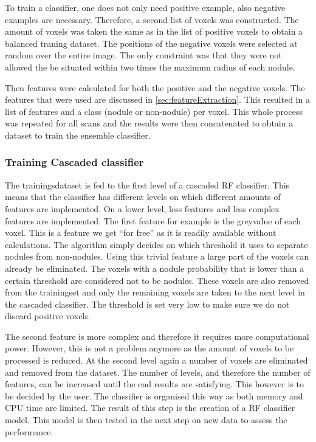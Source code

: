 To train a classifier, one does not only need positive example, also negative
examples are necessary. Therefore, a second list of voxels was constructed. The
amount of voxels was taken the same as in the list of positive voxels to obtain
a balanced traning dataset. The positions of the negative voxels were selected
at random over the entire image. The only constraint was that they were not
allowed the be situated within two times the maximum radius of each nodule.

Then features were calculated for both the positive and the negative voxels. The
features that were used are discussed in \ref{sec:featureExtraction}. This
resulted in a list of features and a class (nodule or non-nodule) per voxel.
This whole process was repeated for all scans and the results were then
concatenated to obtain a dataset to train the ensemble classifier.

\subsubsection{Training Cascaded classifier}
The trainingsdataset is fed to the first level of a cascaded RF classifier. This
means that the classifier has different levels on which different amounts of
features are implemented. On a lower level, less features and less complex
features are implemented. The first feature for example is the greyvalue of each
voxel. This is a feature we get ``for free'' as it is readily available without
calculations. The algorithm simply decides on which threshold it uses to
separate nodules from non-nodules. Using this trivial feature a large part of
the voxels can already be eliminated. The voxels with a nodule probability that
is lower than a certain threshold are considered not to be nodules. These voxels
are also removed from the trainingset and only the remaining voxels are taken to
the next level in the cascaded classifier. The threshold is set very low to make
sure we do not discard positive voxels. 

The second feature is more complex and therefore it requires more computational
power. However, this is not a problem anymore as the amount of voxels to be
processed is reduced. At the second level again a number of voxels are
eliminated and removed from the dataset. The number of levels, and therefore the
number of features, can be increased until the end results are satisfying.
This however is to be decided by the user. The classifier is organised this way
as both memory and CPU time are limited. The result of this step is the creation
of a RF classifier model. This model is then tested in the next step on new data
to assess the performance.

